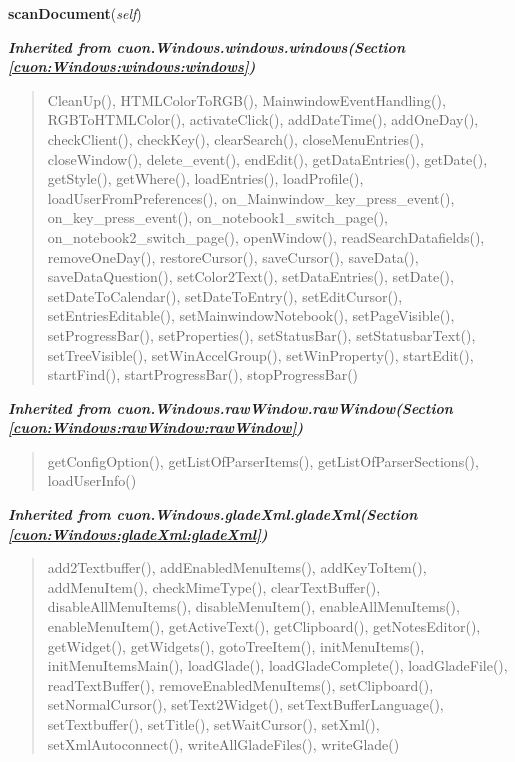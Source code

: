     \vspace{0.5ex}

\hspace{.8\funcindent}\begin{boxedminipage}{\funcwidth}

    \raggedright \textbf{scanDocument}(\textit{self})

\setlength{\parskip}{2ex}
\setlength{\parskip}{1ex}
    \end{boxedminipage}


\large{\textbf{\textit{Inherited from cuon.Windows.windows.windows\textit{(Section \ref{cuon:Windows:windows:windows})}}}}

\begin{quote}
CleanUp(), HTMLColorToRGB(), MainwindowEventHandling(), RGBToHTMLColor(), activateClick(), addDateTime(), addOneDay(), checkClient(), checkKey(), clearSearch(), closeMenuEntries(), closeWindow(), delete\_event(), endEdit(), getDataEntries(), getDate(), getStyle(), getWhere(), loadEntries(), loadProfile(), loadUserFromPreferences(), on\_Mainwindow\_key\_press\_event(), on\_key\_press\_event(), on\_notebook1\_switch\_page(), on\_notebook2\_switch\_page(), openWindow(), readSearchDatafields(), removeOneDay(), restoreCursor(), saveCursor(), saveData(), saveDataQuestion(), setColor2Text(), setDataEntries(), setDate(), setDateToCalendar(), setDateToEntry(), setEditCursor(), setEntriesEditable(), setMainwindowNotebook(), setPageVisible(), setProgressBar(), setProperties(), setStatusBar(), setStatusbarText(), setTreeVisible(), setWinAccelGroup(), setWinProperty(), startEdit(), startFind(), startProgressBar(), stopProgressBar()
\end{quote}

\large{\textbf{\textit{Inherited from cuon.Windows.rawWindow.rawWindow\textit{(Section \ref{cuon:Windows:rawWindow:rawWindow})}}}}

\begin{quote}
getConfigOption(), getListOfParserItems(), getListOfParserSections(), loadUserInfo()
\end{quote}

\large{\textbf{\textit{Inherited from cuon.Windows.gladeXml.gladeXml\textit{(Section \ref{cuon:Windows:gladeXml:gladeXml})}}}}

\begin{quote}
add2Textbuffer(), addEnabledMenuItems(), addKeyToItem(), addMenuItem(), checkMimeType(), clearTextBuffer(), disableAllMenuItems(), disableMenuItem(), enableAllMenuItems(), enableMenuItem(), getActiveText(), getClipboard(), getNotesEditor(), getWidget(), getWidgets(), gotoTreeItem(), initMenuItems(), initMenuItemsMain(), loadGlade(), loadGladeComplete(), loadGladeFile(), readTextBuffer(), removeEnabledMenuItems(), setClipboard(), setNormalCursor(), setText2Widget(), setTextBufferLanguage(), setTextbuffer(), setTitle(), setWaitCursor(), setXml(), setXmlAutoconnect(), writeAllGladeFiles(), writeGlade()
\end{quote}


